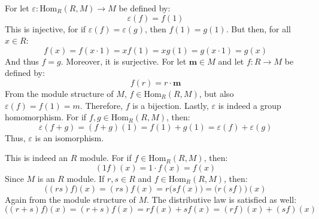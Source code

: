 \documentclass[crop=false,class=article]{standalone}                           %
\begin{document}
        \begin{solution}
            For let $\varepsilon:\textrm{Hom}_{R}(R,M)\rightarrow{M}$ be
            defined by:
            \begin{equation}
                \varepsilon(f)=f(1)
            \end{equation}
            This is injective, for if $\varepsilon(f)=\varepsilon(g)$,
            then $f(1)=g(1)$. But then, for all $x\in{R}$:
            \begin{equation}
                f(x)=f(x\cdot{1})=xf(1)=xg(1)=g(x\cdot{1})=g(x)
            \end{equation}
            And thus $f=g$. Moreover, it is surjective. For let
            $\mathbf{m}\in{M}$ and let $f:R\rightarrow{M}$ be defined by:
            \begin{equation}
                f(r)=r\cdot\mathbf{m}
            \end{equation}
            From the module structure of $M$, $f\in\textrm{Hom}_{R}(R,M)$,
            but also $\varepsilon(f)=f(1)=m$. Therefore, $f$ is a bijection.
            Lastly, $\varepsilon$ is indeed a group homomorphism. For if
            $f,g\in\textrm{Hom}_{R}(R,M)$, then:
            \begin{equation}
                \varepsilon(f+g)=(f+g)(1)=f(1)+g(1)
                                =\varepsilon(f)+\varepsilon(g)
            \end{equation}
            Thus, $\varepsilon$ is an isomorphism.
            \par\hfill\par
            This is indeed an $R$ module. For if
            $f\in\textrm{Hom}_{R}(R,M)$, then:
            \begin{equation}
                (1f)(x)=1\cdot{f}(x)=f(x)
            \end{equation}
            Since $M$ is an $R$ module. If $r,s\in{R}$ and
            $f\in\textrm{Hom}_{R}(R,M)$, then:
            \begin{equation}
                \big((rs)f\big)(x)
                =(rs)f(x)
                =r\big(sf(x)\big)
                =\big(r(sf)\big)(x)
            \end{equation}
            Again from the module structure of $M$. The distributive law
            is satisfied as well:
            \begin{equation}
                \big((r+s)f)(x)=(r+s)f(x)=rf(x)+sf(x)=(rf)(x)+(sf)(x)
            \end{equation}

\end{solution}
\end{document}
